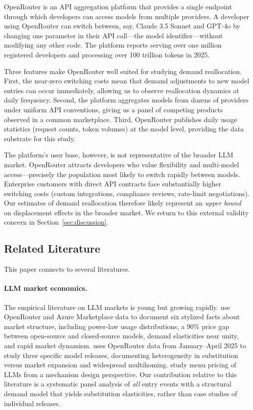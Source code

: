 \documentclass[11pt, a4paper]{article}
\begin{document}
OpenRouter is an API aggregation platform that provides a single endpoint through which developers can access models from multiple providers. A developer using OpenRouter can switch between, say, Claude 3.5 Sonnet and GPT-4o by changing one parameter in their API call---the model identifier---without modifying any other code. The platform reports serving over one million registered developers and processing over 100 trillion tokens in 2025.

Three features make OpenRouter well suited for studying demand reallocation. First, the near-zero switching costs mean that demand adjustments to new model entries can occur immediately, allowing us to observe reallocation dynamics at daily frequency. Second, the platform aggregates models from dozens of providers under uniform API conventions, giving us a panel of competing products observed in a common marketplace. Third, OpenRouter publishes daily usage statistics (request counts, token volumes) at the model level, providing the data substrate for this study.

The platform's user base, however, is not representative of the broader LLM market. OpenRouter attracts developers who value flexibility and multi-model access---precisely the population most likely to switch rapidly between models. Enterprise customers with direct API contracts face substantially higher switching costs (custom integrations, compliance reviews, rate-limit negotiations). Our estimates of demand reallocation therefore likely represent an \emph{upper bound} on displacement effects in the broader market. We return to this external validity concern in Section~\ref{sec:discussion}.

\subsection{Related Literature}

This paper connects to several literatures.

\paragraph{LLM market economics.} The empirical literature on LLM markets is young but growing rapidly. \citet{demirer2025emerging} use OpenRouter and Azure Marketplace data to document six stylized facts about market structure, including power-law usage distributions, a 90\% price gap between open-source and closed-source models, demand elasticities near unity, and rapid market dynamism. \citet{fradkin2025demand} uses OpenRouter data from January--April 2025 to study three specific model releases, documenting heterogeneity in substitution versus market expansion and widespread multihoming. \citet{chenRoskillWilliams2025menu} study menu pricing of LLMs from a mechanism design perspective. Our contribution relative to this literature is a systematic panel analysis of \emph{all} entry events with a structural demand model that yields substitution elasticities, rather than case studies of individual releases.
\end{document}
